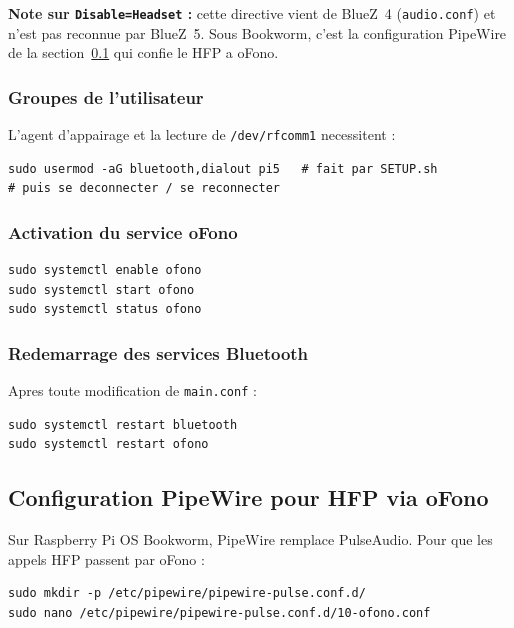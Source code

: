 \documentclass[a4paper,11pt]{article}
\begin{document}
\textbf{Note sur \texttt{Disable=Headset} :} cette directive vient de BlueZ~4
(\texttt{audio.conf}) et n'est pas reconnue par BlueZ~5. Sous Bookworm, c'est la
configuration PipeWire de la section~\ref{sec:pipewire} qui confie le HFP a oFono.

\subsubsection{Groupes de l'utilisateur}

L'agent d'appairage et la lecture de \texttt{/dev/rfcomm1} necessitent :

\begin{lstlisting}[style=bashcode]
sudo usermod -aG bluetooth,dialout pi5   # fait par SETUP.sh
# puis se deconnecter / se reconnecter
\end{lstlisting}

\subsubsection{Activation du service oFono}

\begin{lstlisting}[style=bashcode]
sudo systemctl enable ofono
sudo systemctl start ofono
sudo systemctl status ofono
\end{lstlisting}

\subsubsection{Redemarrage des services Bluetooth}

Apres toute modification de \texttt{main.conf} :

\begin{lstlisting}[style=bashcode]
sudo systemctl restart bluetooth
sudo systemctl restart ofono
\end{lstlisting}

\subsection{Configuration PipeWire pour HFP via oFono}
\label{sec:pipewire}

Sur Raspberry Pi OS Bookworm, PipeWire remplace PulseAudio. Pour que les appels HFP
passent par oFono :

\begin{lstlisting}[style=bashcode]
sudo mkdir -p /etc/pipewire/pipewire-pulse.conf.d/
sudo nano /etc/pipewire/pipewire-pulse.conf.d/10-ofono.conf
\end{lstlisting}
\end{document}
